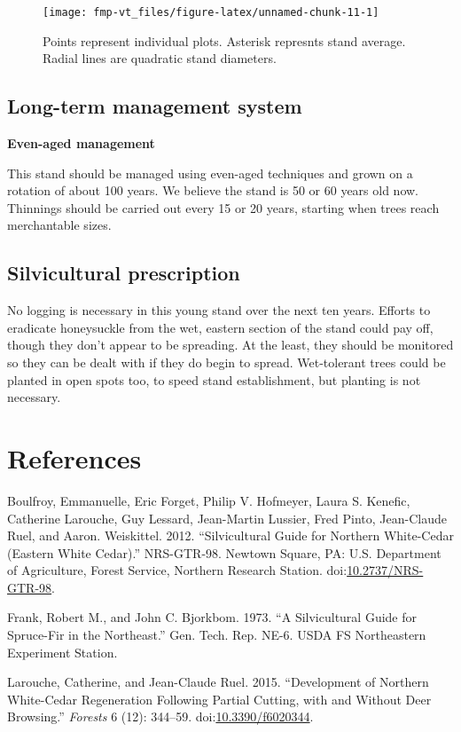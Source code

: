 \documentclass[]{tufte-handout}
\begin{document}
\begin{figure}
\texttt{[image: fmp-vt\_files/figure-latex/unnamed-chunk-11-1]} \caption[Points represent individual plots]{Points represent individual plots. Asterisk represnts stand average. Radial lines are quadratic stand diameters.}\label{fig:unnamed-chunk-11}
\end{figure}

\subsection{Long-term management
system}\label{long-term-management-system-1}

\textbf{Even-aged management}

This stand should be managed using even-aged techniques and grown on a
rotation of about 100 years. We believe the stand is 50 or 60 years old
now. Thinnings should be carried out every 15 or 20 years, starting when
trees reach merchantable sizes.

\subsection{Silvicultural
prescription}\label{silvicultural-prescription-1}

No logging is necessary in this young stand over the next ten years.
Efforts to eradicate honeysuckle from the wet, eastern section of the
stand could pay off, though they don't appear to be spreading. At the
least, they should be monitored so they can be dealt with if they do
begin to spread. Wet-tolerant trees could be planted in open spots too,
to speed stand establishment, but planting is not necessary.

\newpage

\section{References}\label{references}

\setlength{\parindent}{0pt} \setlength{\parskip}{1.5em}

\hypertarget{refs}{}
\hypertarget{ref-boulfroy_silvicultural_2012}{}
Boulfroy, Emmanuelle, Eric Forget, Philip V. Hofmeyer, Laura S. Kenefic,
Catherine Larouche, Guy Lessard, Jean-Martin Lussier, Fred Pinto,
Jean-Claude Ruel, and Aaron. Weiskittel. 2012. ``Silvicultural Guide for
Northern White-Cedar (Eastern White Cedar).'' NRS-GTR-98. Newtown
Square, PA: U.S. Department of Agriculture, Forest Service, Northern
Research Station.
doi:\href{https://doi.org/10.2737/NRS-GTR-98}{10.2737/NRS-GTR-98}.

\hypertarget{ref-frank_silvicultural_1973}{}
Frank, Robert M., and John C. Bjorkbom. 1973. ``A Silvicultural Guide
for Spruce-Fir in the Northeast.'' Gen. Tech. Rep. NE-6. USDA FS
Northeastern Experiment Station.

\hypertarget{ref-larouche_development_2015}{}
Larouche, Catherine, and Jean-Claude Ruel. 2015. ``Development of
Northern White-Cedar Regeneration Following Partial Cutting, with and
Without Deer Browsing.'' \emph{Forests} 6 (12): 344--59.
doi:\href{https://doi.org/10.3390/f6020344}{10.3390/f6020344}.
\end{document}
